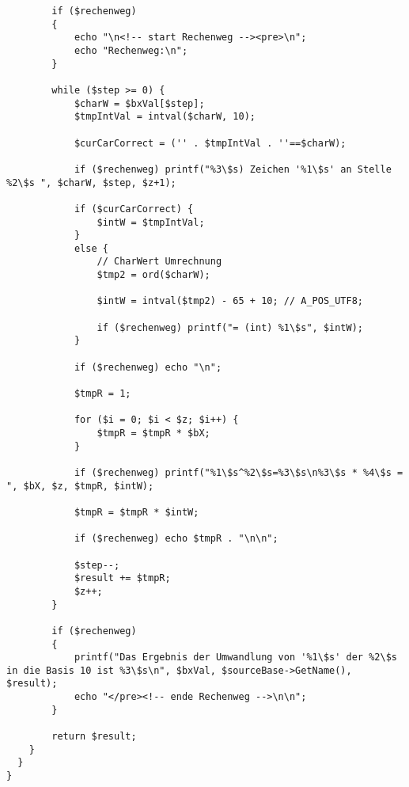 \begin{lstlisting}
    	if ($rechenweg)
    	{
    		echo "\n<!-- start Rechenweg --><pre>\n";
    		echo "Rechenweg:\n";
    	}
    	
    	while ($step >= 0) {
    		$charW = $bxVal[$step];
    		$tmpIntVal = intval($charW, 10);
    		
    		$curCarCorrect = ('' . $tmpIntVal . ''==$charW); 
    		    		
    		if ($rechenweg) printf("%3\$s) Zeichen '%1\$s' an Stelle %2\$s ", $charW, $step, $z+1); 
    		
    		if ($curCarCorrect) {
    			$intW = $tmpIntVal;
    		}
    		else {
    			// CharWert Umrechnung
    			$tmp2 = ord($charW);
    			    			
    			$intW = intval($tmp2) - 65 + 10; // A_POS_UTF8;
    			
    			if ($rechenweg) printf("= (int) %1\$s", $intW);
    		}
    		
    		if ($rechenweg) echo "\n";
    		
    		$tmpR = 1;
    		
    		for ($i = 0; $i < $z; $i++) {
    			$tmpR = $tmpR * $bX;
    		}
    		
    		if ($rechenweg) printf("%1\$s^%2\$s=%3\$s\n%3\$s * %4\$s = ", $bX, $z, $tmpR, $intW);
    		
    		$tmpR = $tmpR * $intW;
    		
    		if ($rechenweg) echo $tmpR . "\n\n";
    		
    		$step--;
    		$result += $tmpR;
    		$z++;
    	}
    	
    	if ($rechenweg)
    	{
    		printf("Das Ergebnis der Umwandlung von '%1\$s' der %2\$s in die Basis 10 ist %3\$s\n", $bxVal, $sourceBase->GetName(), $result);
    		echo "</pre><!-- ende Rechenweg -->\n\n";
    	}
    	
    	return $result;
    }
  }
}
\end{lstlisting}